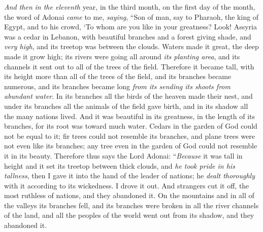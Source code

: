 \begin{biblechapter} %
 \textit{And then} \textit{in the eleventh} year, in the third month, on the first day of the month, the word of Adonai \textit{came} to me, \textit{saying},
\verse “Son of man, say to Pharaoh, the king of Egypt, and to his crowd,
\verse ‘To whom are you like in your greatness?
\verse Look! Assyria was a cedar in Lebanon, 
with beautiful branches and a forest giving shade, 
and \textit{very high}, 
and its treetop was between the clouds.
\verse Waters made it great, 
the deep made it grow high; 
its rivers were going all around \textit{its planting area}, 
and its channels it sent out 
to all of the trees of the field.
\verse Therefore it became tall, 
with its height more than all of the trees of the field, 
and its branches became numerous, 
and its branches became long 
\textit{from its sending its shoots from abundant water}.
\verse In its branches all the birds of the heaven made their nest, 
and under its branches all the animals of the field gave birth, 
and in its shadow all the many nations lived.
\verse And it was beautiful in its greatness, 
in the length of its branches, 
for its root was toward much water.
\verse Cedars in the garden of God 
could not be equal to it; 
fir trees could not resemble its branches, 
and plane trees were not even like its branches; 
any tree even in the garden of God 
could not resemble it in its beauty.
\verse Therefore thus says the Lord Adonai: “\textit{Because} it was tall in height and it set its treetop between thick clouds, and \textit{he took pride in his tallness},
\verse then I gave it into the hand of the leader of nations; he \textit{dealt thoroughly} with it according to its wickedness. I drove it out.
\verse And strangers cut it off, the most ruthless of nations, and they abandoned it. On the mountains and in all of the valleys its branches fell, and its branches were broken in all the river channels of the land, and all the peoples of the world went out from its shadow, and they abandoned it.

\end{biblechapter}
